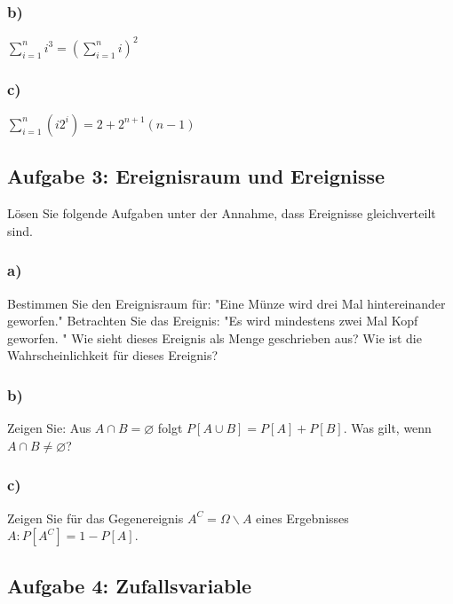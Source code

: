 \documentclass[paper=a4, fontsize=11pt]{scrartcl}
\numberwithin{equation}{section}
\numberwithin{figure}{section}
\numberwithin{table}{section}
\begin{document}
\subsubsection*{b)}

$\sum^{n}_{i=1} i^{3} = (\sum^{n}_{i=1} i)^{2}$

\subsubsection*{c)}

$\sum^{n}_{i=1} (i 2^{i}) = 2 + 2^{n+1} (n-1)$


\subsection{Aufgabe 3: Ereignisraum und Ereignisse}

Lösen Sie folgende Aufgaben unter der Annahme, dass Ereignisse gleichverteilt sind.

\subsubsection*{a)}

Bestimmen Sie den Ereignisraum für: "Eine Münze wird drei Mal hintereinander geworfen." Betrachten Sie das Ereignis: "Es wird mindestens zwei Mal Kopf geworfen. " Wie sieht dieses Ereignis als Menge geschrieben aus? Wie ist die Wahrscheinlichkeit für dieses Ereignis?

\subsubsection*{b)}

Zeigen Sie: Aus $A\cap B =\varnothing$ folgt $P[A \cup B] = P[A] + P[B]$. Was gilt, wenn $A \cap B \neq \varnothing$?

\subsubsection*{c)}

Zeigen Sie für das Gegenereignis $A^{C}= \Omega \backslash A$ eines Ergebnisses $A: P [A^{C}] = 1-P[A]$.


\subsection{Aufgabe 4: Zufallsvariable}
\end{document}
